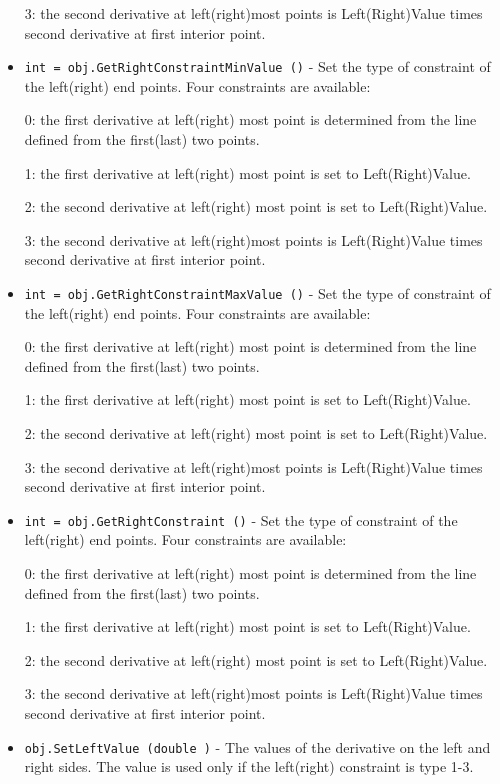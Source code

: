 \begin{itemize}
 3: the second derivative at left(right)most points is Left(Right)Value
 times second derivative at first interior point.

\item  \verb|int = obj.GetRightConstraintMinValue ()| -  Set the type of constraint of the left(right) end points. Four
 constraints are available:

 0: the first derivative at left(right) most point is determined
 from the line defined from the first(last) two points.

 1: the first derivative at left(right) most point is set to
 Left(Right)Value.
 
 2: the second derivative at left(right) most point is set to
 Left(Right)Value.
 
 3: the second derivative at left(right)most points is Left(Right)Value
 times second derivative at first interior point.

\item  \verb|int = obj.GetRightConstraintMaxValue ()| -  Set the type of constraint of the left(right) end points. Four
 constraints are available:

 0: the first derivative at left(right) most point is determined
 from the line defined from the first(last) two points.

 1: the first derivative at left(right) most point is set to
 Left(Right)Value.
 
 2: the second derivative at left(right) most point is set to
 Left(Right)Value.
 
 3: the second derivative at left(right)most points is Left(Right)Value
 times second derivative at first interior point.

\item  \verb|int = obj.GetRightConstraint ()| -  Set the type of constraint of the left(right) end points. Four
 constraints are available:

 0: the first derivative at left(right) most point is determined
 from the line defined from the first(last) two points.

 1: the first derivative at left(right) most point is set to
 Left(Right)Value.
 
 2: the second derivative at left(right) most point is set to
 Left(Right)Value.
 
 3: the second derivative at left(right)most points is Left(Right)Value
 times second derivative at first interior point.

\item  \verb|obj.SetLeftValue (double )| -  The values of the derivative on the left and right sides. The value
 is used only if the left(right) constraint is type 1-3.


\end{itemize}
